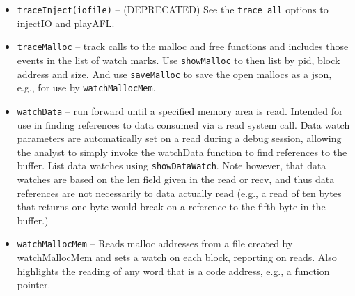 \documentclass[titlepage]{article}
\begin{document}
\begin{itemize}
\begin{itemize}
\item trace\_fd to name a FD to be traced and include it in watch marks per mark\_logs (avoids having to separately issue the traceFD command).
\item no\_reset to stop the simulation rather than resetting the origin, e.g., to adjust a return value from a read.
\item max\_marks to cause the simulation to stop after generated that number of watch marks.  This value includes any marks that become stale due to origin resets.
\item malloc Generate watch marks for each malloc call
\item track\_malloc Track data within malloc buffers.  May be helpful if complex data movement from a buffer to a malloc'ed buffer is not caught by memsomething functons.

\end{itemize}

\item {\tt traceInject(iofile)} -- (DEPRECATED) See the {\tt trace\_all} options to injectIO and playAFL.

\item{\tt traceMalloc} -- track calls to the malloc and free functions and includes those events in the list of watch marks. Use {\tt showMalloc} to 
then list by pid, block address and size.  And use {\tt saveMalloc} to save the open mallocs as a json, e.g., for use by {\tt watchMallocMem}.

\item {\tt watchData} – run forward until a specified memory area is read.  Intended for use in finding references to data consumed via a read system call.  Data watch parameters are automatically set on a read during a debug session, allowing the analyst to simply invoke the watchData function to find references to the buffer.  List data watches using {\tt showDataWatch}.
Note however, that data watches are based on the len field given in the read or recv, and thus data references are not necessarily to data actually read (e.g., a read of ten bytes
that returns one byte would break on a reference to the fifth byte in the buffer.)
\item {\tt watchMallocMem} – Reads malloc addresses from a file created by watchMallocMem and sets a watch on each block, reporting on reads.  Also highlights
the reading of any word that is a code address, e.g., a function pointer.

\end{itemize}
\end{document}
